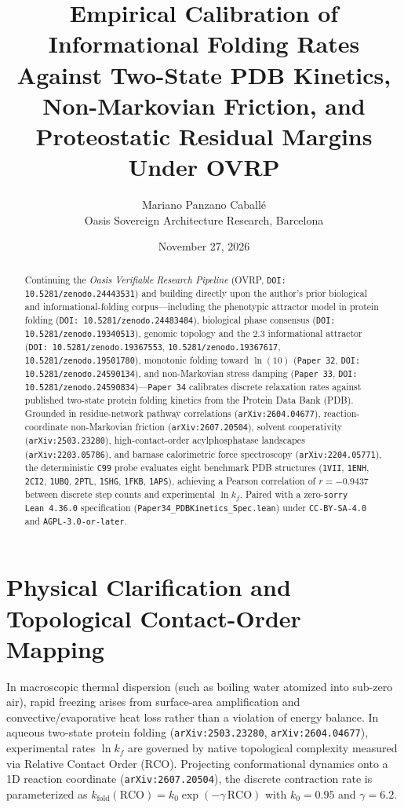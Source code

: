 \documentclass[11pt,a4paper]{article}
\title{Empirical Calibration of Informational Folding Rates Against Two-State PDB Kinetics, Non-Markovian Friction, and Proteostatic Residual Margins Under OVRP}
\author{Mariano Panzano Caball\'e \\ \small Oasis Sovereign Architecture Research, Barcelona}
\date{November 27, 2026}
\begin{document}
\maketitle

\begin{abstract}
Continuing the \emph{Oasis Verifiable Research Pipeline} (OVRP, \texttt{DOI: 10.5281/zenodo.24443531}) and building directly upon the author's prior biological and informational-folding corpus---including the phenotypic attractor model in protein folding (\texttt{DOI: 10.5281/zenodo.24483484}), biological phase consensus (\texttt{DOI: 10.5281/zenodo.19340513}), genomic topology and the $2.3$ informational attractor (\texttt{DOI: 10.5281/zenodo.19367553}, \texttt{10.5281/zenodo.19367617}, \texttt{10.5281/zenodo.19501780}), monotonic folding toward $\ln(10)$ (\texttt{Paper~32}, \texttt{DOI: 10.5281/zenodo.24590134}), and non-Markovian stress damping (\texttt{Paper~33}, \texttt{DOI: 10.5281/zenodo.24590834})---\texttt{Paper~34} calibrates discrete relaxation rates against published two-state protein folding kinetics from the Protein Data Bank (PDB). Grounded in residue-network pathway correlations (\texttt{arXiv:2604.04677}), reaction-coordinate non-Markovian friction (\texttt{arXiv:2607.20504}), solvent cooperativity (\texttt{arXiv:2503.23280}), high-contact-order acylphosphatase landscapes (\texttt{arXiv:2203.05786}), and barnase calorimetric force spectroscopy (\texttt{arXiv:2204.05771}), the deterministic \texttt{C99} probe evaluates eight benchmark PDB structures (\texttt{1VII}, \texttt{1ENH}, \texttt{2CI2}, \texttt{1UBQ}, \texttt{2PTL}, \texttt{1SHG}, \texttt{1FKB}, \texttt{1APS}), achieving a Pearson correlation of $r = -0.9437$ between discrete step counts and experimental $\ln k_f$. Paired with a zero-\texttt{sorry} \texttt{Lean~4.36.0} specification (\texttt{Paper34\_PDBKinetics\_Spec.lean}) under \texttt{CC-BY-SA-4.0} and \texttt{AGPL-3.0-or-later}.
\end{abstract}

\section{Physical Clarification and Topological Contact-Order Mapping}
In macroscopic thermal dispersion (such as boiling water atomized into sub-zero air), rapid freezing arises from surface-area amplification and convective/evaporative heat loss rather than a violation of energy balance. In aqueous two-state protein folding (\texttt{arXiv:2503.23280}, \texttt{arXiv:2604.04677}), experimental rates $\ln k_f$ are governed by native topological complexity measured via Relative Contact Order ($\mathrm{RCO}$). Projecting conformational dynamics onto a 1D reaction coordinate (\texttt{arXiv:2607.20504}), the discrete contraction rate is parameterized as $k_{\mathrm{fold}}(\mathrm{RCO}) = k_0 \exp(-\gamma\,\mathrm{RCO})$ with $k_0 = 0.95$ and $\gamma = 6.2$.
\end{document}
